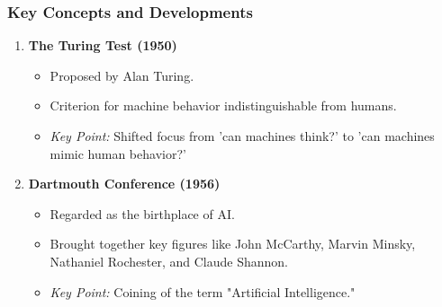 \documentclass[aspectratio=169]{beamer}
\begin{document}
\begin{frame}[fragile]
    \frametitle{Key Concepts and Developments}
    \begin{enumerate}
        \item \textbf{The Turing Test (1950)}
            \begin{itemize}
                \item Proposed by Alan Turing.
                \item Criterion for machine behavior indistinguishable from humans.
                \item \textit{Key Point:} Shifted focus from 'can machines think?' to 'can machines mimic human behavior?'
            \end{itemize}
        \item \textbf{Dartmouth Conference (1956)}
            \begin{itemize}
                \item Regarded as the birthplace of AI.
                \item Brought together key figures like John McCarthy, Marvin Minsky, Nathaniel Rochester, and Claude Shannon.
                \item \textit{Key Point:} Coining of the term "Artificial Intelligence."
            \end{itemize}
    \end{enumerate}
\end{frame}
\end{document}
